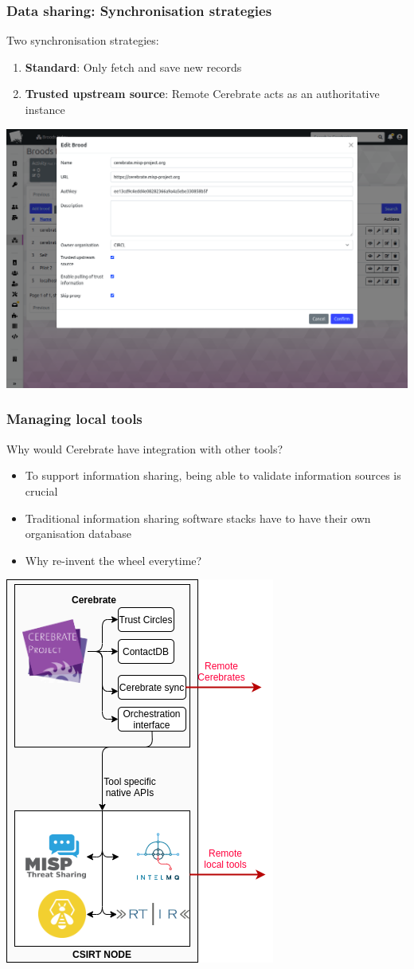 \begin{frame}
\frametitle{Data sharing: Synchronisation strategies}
Two synchronisation strategies:
    \begin{enumerate}
        \item \textbf{Standard}: Only fetch and save new records
        \item \textbf{Trusted upstream source}: Remote Cerebrate acts as an authoritative instance
    \end{enumerate}
    \begin{center}
        \includegraphics[width=0.7\linewidth]{pictures/brood-edit.png}
    \end{center}
\end{frame}

\begin{frame}
\frametitle{Managing local tools}
Why would Cerebrate have integration with other tools?
    \begin{itemize}
        \item To support information sharing, being able to validate information sources is crucial
        \item Traditional information sharing software stacks have to have their own organisation database
        \item Why re-invent the wheel everytime?
    \end{itemize}
    \begin{center}
        \includegraphics[width=0.2\linewidth]{pictures/software-stack.png}
    \end{center}
\end{frame}

